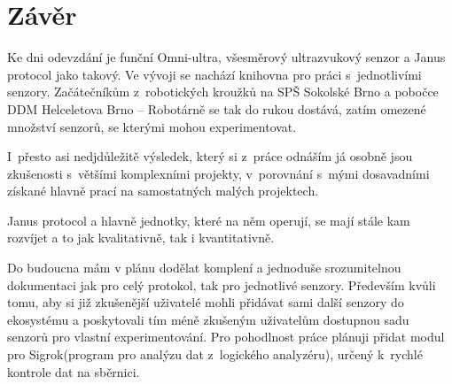 \newpage
\chapter*{Závěr}

Ke dni odevzdání je funční Omni-ultra, všesměrový ultrazvukový senzor a Janus protocol jako takový.
Ve vývoji se nachází knihovna pro práci s~jednotlivími senzory.
Začátečníkům z~robotických kroužků na SPŠ Sokolské Brno\cite{sokolska} a pobočce DDM Helceletova Brno -- Robotárně\cite{robotarna} se tak do rukou dostává, zatím omezené množství senzorů, se kterými mohou experimentovat.

I~přesto asi nedjdůležitě výsledek, který si z~práce odnáším já osobně jsou zkušenosti s~většími komplexními projekty, v~porovnání s~mými dosavadními získané hlavně prací na samostatných malých projektech.

Janus protocol a hlavně jednotky, které na něm operují, se mají stále kam rozvíjet a to jak kvalitativně, tak i kvantitativně.

Do budoucna mám v plánu dodělat komplení a jednoduše srozumitelnou dokumentaci jak pro celý protokol, tak pro jednotlivé senzory.
Především kvůli tomu, aby si již zkušenější uživatelé mohli přidávat sami další senzory do ekosystému a poskytovali tím méně zkušeným uživatelům dostupnou sadu senzorů pro vlastní experimentování.
Pro pohodlnost práce plánuji přidat modul pro Sigrok(program pro analýzu dat z~logického analyzéru), určený k~rychlé kontrole dat na sběrnici.
